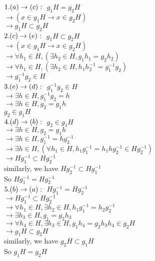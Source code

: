 \documentclass[a4paper, justified]{tufte-handout}
\begin{document}
\begin{solution}
$1. (a)\to (c):\\$
$g_1H=g_2H$\\
$\to (x\in g_1H\to x\in g_2 H)$\\
$\to g_1H\subset g_2H$\\

\noindent $2. (c)\to (e):\\$
$ g_1H\subset g_2H$\\
$\to (x\in g_1H\to x\in g_2 H)$\\
$\to\forall h_1\in H, (\exists h_2\in H, g_1h_1=g_2h_2)$\\
$\to \forall h_1\in H, (\exists h_2\in H, h_1h_2^{-1}=g_1^{-1}g_2)$\\
$\to g_1^{-1}g_2\in H$\\

\noindent $3. (e)\to (d):\\$
$g_1^{-1}g_2\in H$\\
$\to \exists h\in H, g_1^{-1}g_2=h$\\
$\to \exists h\in H, g_2=g_1h$\\
$g_2\in g_1H$\\

\noindent $4. (d)\to (b):\\$
$g_2\in g_1H$\\
$\to \exists h\in H, g_2=g_1h$\\
$\to \exists h\in H, g_1^{-1}=hg_2^{-1}$\\
$\to \exists h\in H, (\forall h_1\in H,h_1g_1^{-1}=h_1hg_2^{-1}\in Hg_2^{-1})$\\
$\to Hg_1^{-1}\subset Hg_2^{-1}$\\
similarly, we have $Hg_2^{-1}\subset Hg_1^{-1}$\\
So $Hg_1^{-1}= Hg_2^{-1}$\\

\noindent $5. (b)\to (a):\\$
$Hg_1^{-1}= Hg_2^{-1}$\\
$\to Hg_1^{-1}\subset Hg_2^{-1}$\\
$\to \forall h_1\in H, \exists h_2\in H, h_1g_1^{-1}= h_2g_2^{-1}$\\
$\to \exists h_3\in H, g_1=g_2h_3$\\
$\to \forall h_4\in H, \exists h_3\in H, g_1h_4=g_2h_3h_4\in g_2H$\\
$\to g_1H\subset g_2H$\\
similarly, we have $g_2H\subset g_1H$\\
So $g_1H= g_2H$\\
\end{solution}
\end{document}
